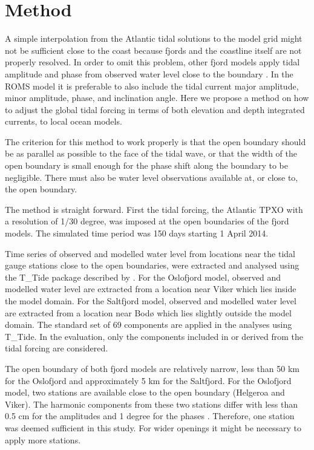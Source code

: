 \section{Method}

A simple interpolation from the Atlantic tidal solutions to the model grid might not be sufficient close to the coast because fjords and the coastline itself are not properly resolved. In order to omit this problem, other fjord models apply tidal amplitude and phase from observed water level close to the boundary \cite[i.e.]{foreman90,svendsen96,lynge13}. In the ROMS model it is preferable to also include the tidal current major amplitude, minor amplitude, phase, and inclination angle. Here we propose a method on how to adjust the global tidal forcing in terms of both elevation and depth integrated currents, to local ocean models. 

The criterion for this method to work properly is that the open boundary should be as parallel as possible to the face of the tidal wave, or that the width of the open boundary is small enough for the phase shift along the boundary to be negligible. There must also be water level observations available at, or close to, the open boundary.

The method is straight forward. First the tidal forcing, the Atlantic TPXO with a resolution of 1/30 degree, was imposed at the open boundaries of the fjord models. The simulated time period was 150 days starting 1 April 2014. 

Time series of observed and modelled water level from locations near the tidal gauge stations close to the open boundaries, were extracted and analysed using the T\_Tide package described by \cite{pawlowicz02}. For the Oslofjord model, observed and modelled water level are extracted from a location near Viker which lies inside the model domain. For the Saltfjord model, observed and modelled water level are extracted from a location near Bod{\o} which lies slightly outside the model domain. The standard set of 69 components are applied in the analyses using T\_Tide. In the evaluation, only the components included in or derived from the tidal forcing are considered. 

The open boundary of both fjord models are relatively narrow, less than 50 km for the Oslofjord and approximately 5 km for the Saltfjord. For the Oslofjord model, two stations are available close to the open boundary (Helgeroa and Viker). The harmonic components from these two stations differ with less than 0.5 cm for the amplitudes and 1 degree for the phases \cite[]{tide16}. Therefore, one station was deemed sufficient in this study. For wider openings it might be necessary to apply more stations. 

